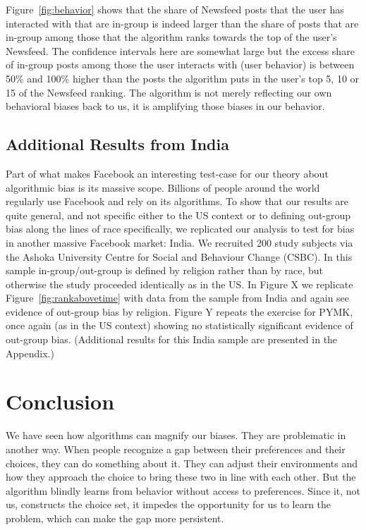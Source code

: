 \documentclass[12pt,letterpaper]{article}
\begin{document}
Figure~\ref{fig:behavior} shows that the share of Newsfeed posts that the user has interacted with that are in-group is indeed larger than the share of posts that are in-group among those that the algorithm ranks towards the top of the user's Newsfeed. The confidence intervals here are somewhat large but the excess share of in-group posts among those the user interacts with (user behavior) is between 50\% and 100\% higher than the posts the algorithm puts in the user's top 5, 10 or 15 of the Newsfeed ranking. The algorithm is not merely reflecting our own behavioral biases back to us, it is amplifying those biases in our behavior.

\subsection{Additional Results from India}

Part of what makes Facebook an interesting test-case for our theory about algorithmic bias is its massive scope. Billions of people around the world regularly use Facebook and rely on its algorithms. To show that our results are quite general, and not specific either to the US context or to defining out-group bias along the lines of race specifically, we replicated our analysis to test for bias in another massive Facebook market: India. We recruited 200 study subjects via the Ashoka University Centre for Social and Behaviour Change (CSBC). In this sample in-group/out-group is defined by religion rather than by race, but otherwise the study proceeded identically as in the US. In Figure X we replicate Figure~\ref{fig:rankabovetime} with data from the sample from India and again see evidence of out-group bias by religion. Figure Y repeats the exercise for PYMK, once again (as in the US context) showing no statistically significant evidence of out-group bias. (Additional results for this India sample are presented in the Appendix.)


\section{Conclusion}
We have seen how algorithms can magnify our biases. They are problematic in another way. When people recognize a gap between their preferences and their choices, they can do something about it. They can adjust their environments and how they approach the choice to bring these two in line with each other. But the algorithm blindly learns from behavior without access to preferences. Since it, not us, constructs the choice set, it impedes the opportunity for us to learn the problem, which can make the gap more persistent.
\end{document}
